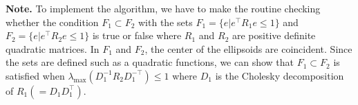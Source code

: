 \documentclass[letterpaper, 10 pt, conference]{ieeeconf}  %
\begin{document}
%

\noindent\textbf{Note.} 
To implement the algorithm, we have to make the routine checking whether the condition $F_1 \subset F_2$ with the sets $F_1 = \{e|e^\top R_1 e \leq 1\}$ and $F_2 = \{e|e^\top R_2 e \leq 1\}$ is true or false where $R_1$ and $R_2$ are positive definite quadratic matrices.
In $F_1$ and $F_2$, the center of the ellipsoids are coincident. 
Since the sets are defined such as a quadratic functions,
we can show that $F_1 \subset F_2$ is satisfied when $\lambda_{\max}(D_1^{-1}R_2D_1^{-\top} )\leq 1$ where $D_1$ is the Cholesky decomposition of $R_1( = D_1D_1^\top)$.
\end{document}
